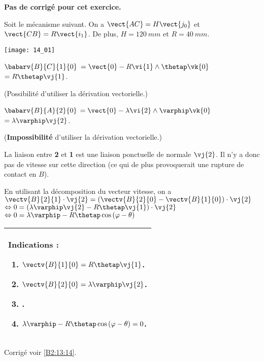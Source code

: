 \normalfalse \difficiletrue \tdifficilefalse
\correctiontrue


\setcounter{numques}{0}
\ifcorrection
\else
\textbf{Pas de corrigé pour cet exercice.}
\fi

\ifprof
\else
Soit le mécanisme suivant. On a $\vect{AC}=H\vect{j_0}$ et $\vect{CB}=R\vect{i_1}$. De plus, 
$H=\SI{120}{mm}$ et $R=\SI{40}{mm}$. 

\begin{center}
\texttt{[image: 14\_01]}
\end{center}
\fi


\ifprof
$\babarv{B}{C}{1}{0}$ 
$=\vect{0}-R\vi{1}\wedge\thetap\vk{0}$
$=R\thetap\vj{1}$.

(Possibilité d'utiliser la dérivation vectorielle.)

\else
\fi

\ifprof
$\babarv{B}{A}{2}{0}$ 
$=\vect{0}-\lambda \vi{2}\wedge\varphip\vk{0}$
$=\lambda\varphip\vj{2}$.

(\textbf{Impossibilité} d'utiliser la dérivation vectorielle.)

\else
\fi

\ifprof
La liaison entre \textbf{2} et \textbf{1} est une liaison ponctuelle de normale $\vj{2}$. Il n'y a donc pas de vitesse sur cette direction (ce qui de plus provoquerait une rupture de contact en $B$). 
\else
\fi

\ifprof
En utilisant la décomposition du vecteur vitesse, on a
$\vectv{B}{2}{1}\cdot \vj{2} =\left( \vectv{B}{2}{0} - \vectv{B}{1}{0}\right) \cdot \vj{2}$
$ \Leftrightarrow {0} =\left( \lambda\varphip\vj{2} - R\thetap\vj{1}\right) \cdot \vj{2}$
$ \Leftrightarrow {0} = \lambda\varphip - R\thetap \cos \left( \varphi - \theta\right)$

\else
\fi





\ifprof
\else
\footnotesize
\begin{center}
\begin{tabular}{|p{.9\linewidth}|}
\hline
Indications :
\begin{enumerate}
\item $\vectv{B}{1}{0}=R\thetap\vj{1}$.
\item $\vectv{B}{2}{0}=\lambda\varphip\vj{2}$.
\item .
\item $ \lambda\varphip - R\thetap \cos \left( \varphi - \theta\right)=0$.
\end{enumerate} \\ \hline
\end{tabular}
\end{center}
\normalsize

\begin{flushright}
\footnotesize{Corrigé  voir \ref{B2:13:14}.}
\end{flushright}%
\fi